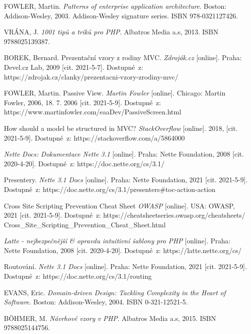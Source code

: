 FOWLER, Martin. \textit{Patterns of enterprise application architecture}. Boston: Addison-Wesley, 2003. Addison-Wesley signature series. ISBN 978-0321127426.

VRÁNA, J. \textit{1001 tipů a triků pro PHP}. Albatros Media a.s, 2013. ISBN 9788025139387.

BOREK, Bernard. Prezentační vzory z rodiny MVC. \textit{Zdroják.cz} [online]. Praha: Devel.cz Lab, 2009 [cit. 2021-5-7]. Dostupné~z: https://zdrojak.cz/clanky/prezentacni-vzory-zrodiny-mvc/

FOWLER, Martin. Passive View. \textit{Martin Fowler} [online]. Chicago: Martin Fowler, 2006, 18. 7. 2006 [cit. 2021-5-9]. Dostupné~z: https://www.martinfowler.com/eaaDev/PassiveScreen.html

How should a model be structured in MVC? \textit{StackOverflow} [online]. 2018, [cit. 2021-5-9]. Dostupné~z: https://stackoverflow.com/a/5864000

\textit{Nette Docs: Dokumentace Nette 3.1} [online]. Praha: Nette Foundation, 2008 [cit. 2020-4-20]. Dostupné~z: https://doc.nette.org/cs/3.1/

Presentery. \textit{Nette 3.1 Docs} [online]. Praha: Nette Foundation, 2021 [cit. 2021-5-9]. Dostupné~z: https://doc.nette.org/cs/3.1/presenters\#toc-action-action

Cross Site Scripting Prevention Cheat Sheet \textit{OWASP} [online]. USA: OWASP, 2021 [cit. 2021-5-9]. Dostupné~z: https://cheatsheetseries.owasp.org/cheatsheets/\\Cross{\_}Site{\_}Scripting{\_}Prevention{\_}Cheat{\_}Sheet.html

\textit{Latte - nejbezpečnější {\&} opravdu intuitivní šablony pro PHP} [online]. Praha: Nette Foundation, 2008 [cit. 2020-4-20]. Dostupné~z: https://latte.nette.org/cs/

Routování. \textit{Nette 3.1 Docs} [online]. Praha: Nette Foundation, 2021 [cit. 2021-5-9]. Dostupné~z: https://doc.nette.org/cs/3.1/routing

EVANS, Eric. \textit{Domain-driven Design: Tackling Complexity in the Heart of Software}. Boston: Addison-Wesley, 2004. ISBN 0-321-12521-5.

BÖHMER, M. \textit{Návrhové vzory v PHP}. Albatros Media a.s, 2015. ISBN 9788025144756.

